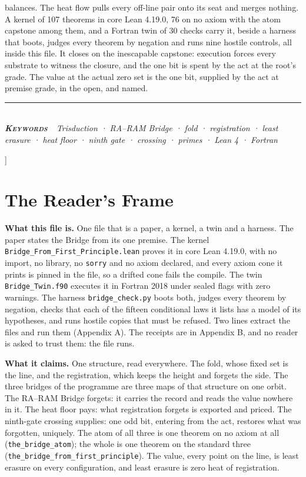 \documentclass[10pt,twocolumn]{article}
\begin{document}
{\begin{minipage}{\textwidth}
{balances. The heat flow pulls every off-line pair onto its seat and
merges nothing. A kernel of 107 theorems in core Lean 4.19.0, 76 on no
axiom with the atom capstone among them, and a Fortran twin of 30 checks
carry it, beside a harness that boots, judges every theorem by negation
and runs nine hostile controls, all inside this file. It closes on the
inescapable capstone: execution forces every substrate to witness the
closure, and the one bit is spent by the act at the root's grade. The
value at the actual zero set is the one bit, supplied by the act at
premise grade, in the open, and named.}\\[4pt]
{\color{accent}\rule{\textwidth}{0.6pt}}\\[3pt]
{\itshape\footnotesize\color{faint}\textbf{\upshape\scshape\color{deep}Keywords\ }\ Trisduction
· RA--RAM Bridge · fold · registration · least erasure · heat floor ·
ninth gate · crossing · primes · Lean 4 · Fortran}\\[12pt]
\end{minipage}
}]
\thispagestyle{fancy}
\hypertarget{the-readers-frame}{%
\section{The Reader's Frame}\label{the-readers-frame}}

\textbf{What this file is.} One file that is a paper, a kernel, a twin
and a harness. The paper states the Bridge from its one premise. The
kernel \texttt{Bridge\_\allowbreak{}From\_\allowbreak{}First\_\allowbreak{}Principle.lean} proves it in core
Lean 4.19.0, with no import, no library, no \texttt{sorry} and no axiom
declared, and every axiom cone it prints is pinned in the file, so a
drifted cone fails the compile. The twin \texttt{Bridge\_\allowbreak{}Twin.f90}
executes it in Fortran 2018 under sealed flags with zero warnings. The
harness \texttt{bridge\_\allowbreak{}check.py} boots both, judges every theorem by
negation, checks that each of the fifteen conditional laws it lists has
a model of its hypotheses, and runs hostile copies that must be refused.
Two lines extract the files and run them (Appendix A). The receipts are
in Appendix B, and no reader is asked to trust them: the file runs.

\textbf{What it claims.} One structure, read everywhere. The fold, whose
fixed set is the line, and the registration, which keeps the height and
forgets the side. The three bridges of the programme are three maps of
that structure on one orbit. The RA--RAM Bridge forgets: it carries the
record and reads the value nowhere in it. The heat floor pays: what
registration forgets is exported and priced. The ninth-gate crossing
supplies: one odd bit, entering from the act, restores what was
forgotten, uniquely. The atom of all three is one theorem on no axiom at
all (\texttt{the\_\allowbreak{}bridge\_\allowbreak{}atom}); the whole is one theorem on the
standard three (\texttt{the\_\allowbreak{}bridge\_\allowbreak{}from\_\allowbreak{}first\_\allowbreak{}principle}). The
value, every point on the line, is least erasure on every configuration,
and least erasure is zero heat of registration.
\end{document}
